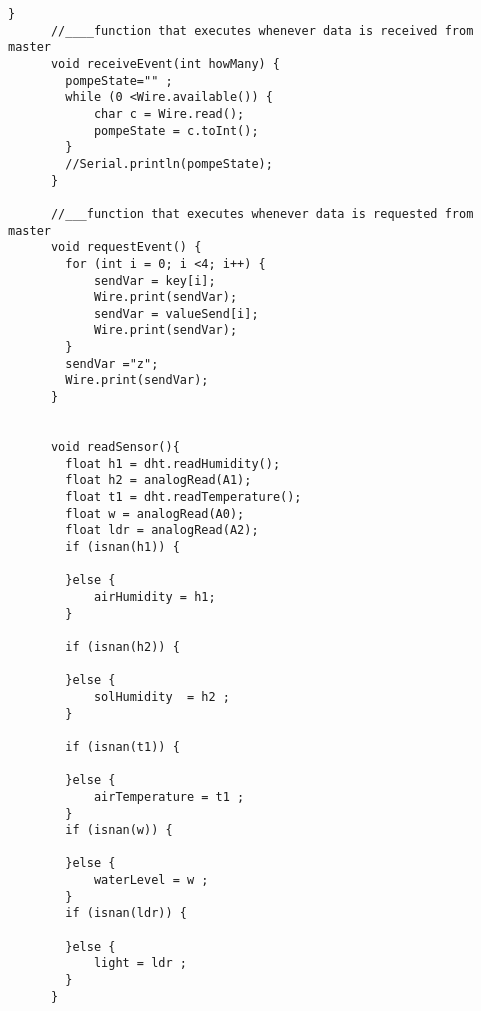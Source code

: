 \begin{flushleft}
\begin{lstlisting}[style=CStyle]
	  }
	  //____function that executes whenever data is received from master
	  void receiveEvent(int howMany) {
	  	pompeState="" ;
	  	while (0 <Wire.available()) {
	  		char c = Wire.read();      
	  		pompeState = c.toInt();
	  	}  
	  	//Serial.println(pompeState);           
	  }
	  
	  //___function that executes whenever data is requested from master
	  void requestEvent() {
	  	for (int i = 0; i <4; i++) {
	  		sendVar = key[i];
	  		Wire.print(sendVar);
	  		sendVar = valueSend[i];
	  		Wire.print(sendVar);
	  	}
	  	sendVar ="z";
	  	Wire.print(sendVar);
	  }
	  
	  
	  void readSensor(){
	  	float h1 = dht.readHumidity();
	  	float h2 = analogRead(A1);
	  	float t1 = dht.readTemperature();
	  	float w = analogRead(A0);
	  	float ldr = analogRead(A2);
	  	if (isnan(h1)) {    
	  		
	  	}else {
	  		airHumidity = h1;
	  	}
	  	
	  	if (isnan(h2)) {    
	  		
	  	}else {
	  		solHumidity  = h2 ;
	  	}
	  	
	  	if (isnan(t1)) {    
	  		
	  	}else {
	  		airTemperature = t1 ;
	  	}
	  	if (isnan(w)) {    
	  		
	  	}else {
	  		waterLevel = w ;
	  	}
	  	if (isnan(ldr)) {    
	  		
	  	}else {
	  		light = ldr ;
	  	}
	  }
	\end{lstlisting}
\end{flushleft}
